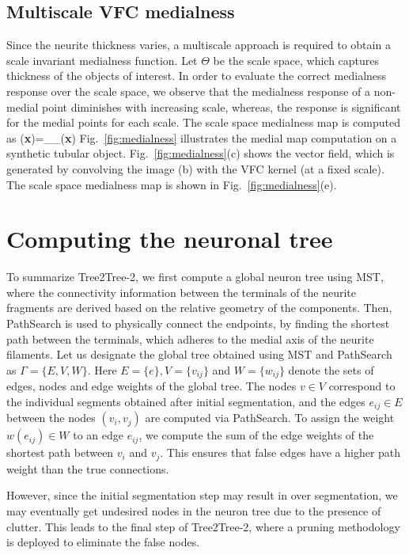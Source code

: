 \subsection{Multiscale VFC medialness}
Since the neurite thickness varies, a multiscale approach is required to obtain a scale invariant medialness function.  Let $\Theta$ be the scale space, which captures thickness of the objects of interest. In order to evaluate the correct medialness response over the scale space, we observe that the medialness response of a non-medial point diminishes with increasing scale, whereas, the response is significant for the medial points for each scale. The scale space medialness map is computed as
\bea
\mu(\textbf{x})=\sum_{\gamma \in \Theta}\mu_{\gamma}(\textbf{x})
\label{eq:medialness_map}
\eea
Fig.~\ref{fig:medialness} illustrates the medial map computation on a synthetic tubular object. Fig.~\ref{fig:medialness}(c) shows the vector field, which is generated by convolving the image (b) with the VFC kernel (at a fixed scale). The scale space medialness map is shown in Fig.~\ref{fig:medialness}(e). 


\section{Computing the neuronal tree}
To summarize Tree2Tree-2, we first compute a global neuron tree using MST, where the connectivity information between the terminals of the neurite fragments are derived based on the relative geometry of the components. Then, PathSearch is used to physically connect the endpoints, by finding the shortest path between the terminals, which adheres to the medial axis of the neurite filaments.
Let us designate the global tree obtained using MST and PathSearch as $\Gamma=\{E,V,W\}$. Here $E = \{e\},V=\{v_{ij}\}$ and $W=\{w_{ij}\}$ denote the sets of edges, nodes and edge weights of the global tree.
The  nodes $v\in V$ correspond to the individual segments obtained after initial segmentation, and the edges $e_{ij}\in E$ between the nodes $(v_i,v_j)$  are computed via PathSearch. To assign the weight $w(e_{ij})\in W$ to an edge $e_{ij}$, we compute the sum of the edge weights of the shortest path between $v_i$ and $v_j$. This ensures that false edges have a higher path weight than the true connections. 

However, since the initial segmentation step may result in over segmentation, we may eventually get undesired nodes in the neuron tree due to the presence of clutter. 
This leads to the final step of Tree2Tree-2, where a pruning methodology is deployed to eliminate the false nodes.

